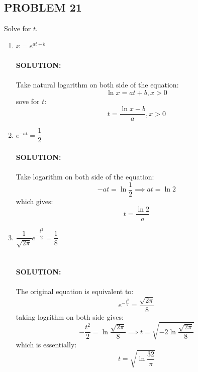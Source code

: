 \documentclass{article}
\begin{document}
\subsection*{PROBLEM 21}

\vspace{1em}
Solve for $t$.
\vspace{1em}

\begin{enumerate}[label=(\alph*),itemsep=4ex,partopsep=1ex]

\item $x = e^{at+b}$ \\\\
\textbf{SOLUTION:}\\\\
Take natural logarithm on both side of the equation:
$$\ln{x} = at + b, x > 0 $$
sove for $t$:
$$t = \frac{\ln{x} - b}{a}, x > 0$$

\item $e^{-at} = \dfrac{1}{2}$ \\\\
\textbf{SOLUTION:}\\\\
Take logarithm on both side of the equation:
$$-at = \ln{\frac{1}{2}} \implies at = \ln{2} $$
which gives:
$$t = \frac{\ln{2}}{a}$$

\item $\dfrac{1}{\sqrt{2\pi}}e^{-\dfrac{t^2}{2}} = \dfrac{1}{8}$ \\\\\\
\textbf{SOLUTION:}\\\\
The original equation is equivalent to:
$$ e^{-\frac{t^2}{2}} = \frac{\sqrt{2\pi}}{8} $$
taking logrithm on both side gives:
$$-\frac{t^2}{2} = \ln{\frac{\sqrt{2\pi}}{8}} \implies t = \sqrt{-2\ln{\frac{\sqrt{2\pi}}{8}}}$$
which is essentially:
$$ t = \sqrt{\ln{\frac{32}{\pi}}}$$

\end{enumerate}
\end{document}
